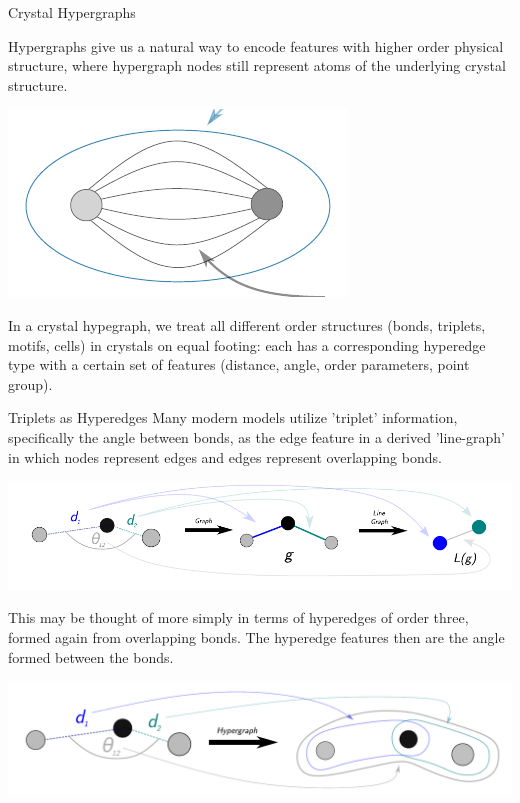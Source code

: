 \documentclass[11pt]{beamer}
\begin{document}
\begin{frame}{Crystal Hypergraphs}

Hypergraphs give us a natural way to encode features with higher order physical structure, where hypergraph nodes still represent atoms of the underlying crystal structure.\pause
\begin{center}
\includegraphics[scale=0.7]{hyperedge_ex.pdf}
\end{center}
\vspace{.5cm}

In a crystal hypegraph, we treat all different order structures (bonds, triplets, motifs, cells) in crystals on equal footing: \pause each has a corresponding hyperedge type with a certain set of features (distance, angle, order parameters, point group).
\end{frame}

\begin{frame}{Triplets as Hyperedges}
\small
Many modern models utilize 'triplet' information, specifically the angle between bonds, as the edge feature in a derived 'line-graph' in which nodes represent edges and edges represent overlapping bonds.

\begin{center}

\includegraphics[scale=0.55]{line_graph_ex.pdf}

\end{center}\pause

This may be thought of more simply in terms of hyperedges of order three, formed again from overlapping bonds. The hyperedge features then are the angle formed between the bonds. \pause

\begin{center}

\includegraphics[scale=0.3]{triplet_ex.pdf}

\end{center}

\end{frame}
\end{document}
